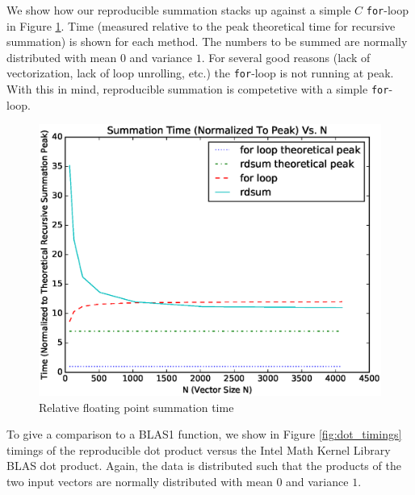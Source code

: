     We show how our reproducible summation stacks up against a simple $C$ \texttt{for}-loop in Figure \ref{fig:forloop_timings}. Time (measured relative to the peak theoretical time for recursive summation) is shown for each method. The numbers to be summed are normally distributed with mean $0$ and variance $1$. For several good reasons (lack of vectorization, lack of loop unrolling, etc.) the \texttt{for}-loop is not running at peak. With this in mind, reproducible summation is competetive with a simple \texttt{for}-loop.
  \begin{figure}[H]
  \begin{center}
  \includegraphics[width=\textwidth]{plots/sum_comparison}
  \caption{Relative floating point summation time}
  \label{fig:forloop_timings}
  \end{center}
  \end{figure}
    To give a comparison to a BLAS1 function, we show in Figure \ref{fig:dot_timings} timings of the reproducible dot product versus the Intel Math Kernel Library \cite{MKL} BLAS dot product. Again, the data is distributed such that the products of the two input vectors are normally distributed with mean $0$ and variance $1$.
